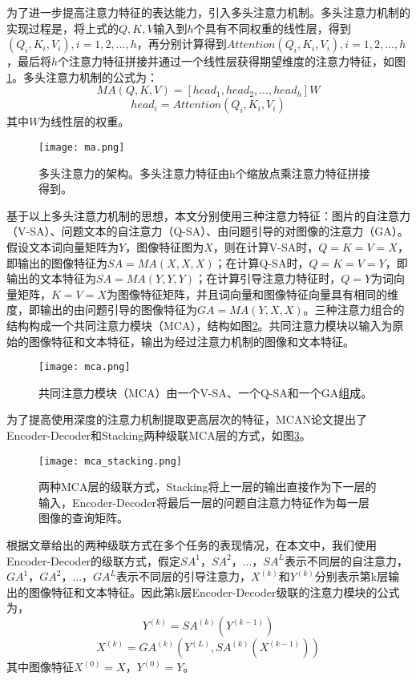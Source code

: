 为了进一步提高注意力特征的表达能力，引入多头注意力机制。多头注意力机制的实现过程是，将上式的$Q, K, V$输入到$h$个具有不同权重的线性层，得到$(Q_i, K_i, V_i), i = 1, 2, ..., h$，再分别计算得到$Attention(Q_i, K_i, V_i), i = 1, 2, ..., h$，最后将$h$个注意力特征拼接并通过一个线性层获得期望维度的注意力特征，如图\ref{ma}。多头注意力机制的公式为：
\begin{equation}
MA(Q, K, V) = [head_1, head_2, ..., head_h]W
\end{equation}
\begin{equation}
head_i = Attention(Q_i, K_i, V_i)
\end{equation}
其中$W$为线性层的权重。
\begin{figure}[H]
	\texttt{[image: ma.png]}
	\caption{多头注意力的架构。多头注意力特征由h个缩放点乘注意力特征拼接得到。}
	\label{ma}
\end{figure}

基于以上多头注意力机制的思想，本文分别使用三种注意力特征：图片的自注意力（V-SA）、问题文本的自注意力（Q-SA）、由问题引导的对图像的注意力（GA）。假设文本词向量矩阵为$Y$，图像特征图为$X$，则在计算V-SA时，$Q = K = V = X$，即输出的图像特征为$SA=MA(X, X, X)$；在计算Q-SA时，$Q = K = V = Y$，即输出的文本特征为$SA=MA(Y, Y, Y)$；在计算引导注意力特征时，$Q = Y$为词向量矩阵，$K = V = X$为图像特征矩阵，并且词向量和图像特征向量具有相同的维度，即输出的由问题引导的图像特征为$GA=MA(Y, X, X)$。三种注意力组合的结构构成一个共同注意力模块（MCA），结构如图\ref{mca}。共同注意力模块以输入为原始的图像特征和文本特征，输出为经过注意力机制的图像和文本特征。
\begin{figure}[H]
	\texttt{[image: mca.png]}
	\caption{共同注意力模块（MCA）由一个V-SA、一个Q-SA和一个GA组成。}
	\label{mca}
\end{figure}

为了提高使用深度的注意力机制提取更高层次的特征，MCAN论文提出了Encoder-Decoder和Stacking两种级联MCA层的方式，如图\ref{mca_stacking}。
\begin{figure}[H]
	\texttt{[image: mca\_stacking.png]}
	\caption{两种MCA层的级联方式，Stacking将上一层的输出直接作为下一层的输入，Encoder-Decoder将最后一层的问题自注意力特征作为每一层图像的查询矩阵。}
	\label{mca_stacking}
\end{figure}

根据文章给出的两种级联方式在多个任务的表现情况，在本文中，我们使用Encoder-Decoder的级联方式，假定$SA^1$，$SA^2$，...，$SA^L$表示不同层的自注意力，$GA^1$，$GA^2$，...，$GA^L$表示不同层的引导注意力，$X^{(k)}$和$Y^{(k)}$分别表示第k层输出的图像特征和文本特征。因此第k层Encoder-Decoder级联的注意力模块的公式为，
\begin{equation}
Y^{(k)} = SA^{(k)}(Y^{(k-1)})
\end{equation}
\begin{equation}
X^{(k)} = GA^{(k)}(Y^{(L)}, SA^{(k)}(X^{(k-1)}))
\end{equation}
其中图像特征$X^{(0)}=X$，$Y^{(0)}=Y$。

